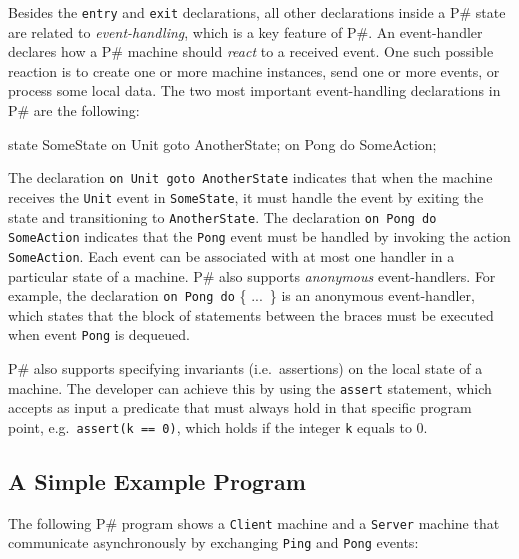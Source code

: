 \documentclass{llncs}
\newcommand{\ps}{P\#\xspace}
\begin{document}
Besides the \texttt{entry} and \texttt{exit} declarations, all other declarations inside a \ps state are related to \emph{event-handling}, which is a key feature of \ps. An event-handler declares how a \ps machine should \emph{react} to a received event. One such possible reaction is to create one or more machine instances, send one or more events, or process some local data. The two most important event-handling declarations in \ps are the following:

\begin{psharpNoLines}
state SomeState {
  on Unit goto AnotherState;
  on Pong do SomeAction;
}
\end{psharpNoLines}

\noindent
The declaration \texttt{on Unit goto AnotherState} indicates that when the machine receives the \texttt{Unit} event in \texttt{SomeState}, it must handle the event by exiting the state and transitioning to \texttt{AnotherState}. The declaration \texttt{on Pong do SomeAction} indicates that the \texttt{Pong} event must be handled by invoking the action \texttt{SomeAction}. Each event can be associated with at most one handler in a particular state of a machine. \ps also supports \emph{anonymous} event-handlers. For example, the declaration \texttt{on Pong do} \{ ...\ \} is an anonymous event-handler, which states that the block of statements between the braces must be executed when event \texttt{Pong} is dequeued.

\ps also supports specifying invariants (i.e.\ assertions) on the local state of a machine. The developer can achieve this by using the \texttt{assert} statement, which accepts as input a predicate that must always hold in that specific program point, e.g.\ \texttt{assert(k == 0)}, which holds if the integer \texttt{k} equals to 0.

\subsection{A Simple Example Program}
\label{sec:basics:example}

The following \ps program shows a \texttt{Client} machine and a \texttt{Server} machine that communicate asynchronously by exchanging \texttt{Ping} and \texttt{Pong} events:
\end{document}

